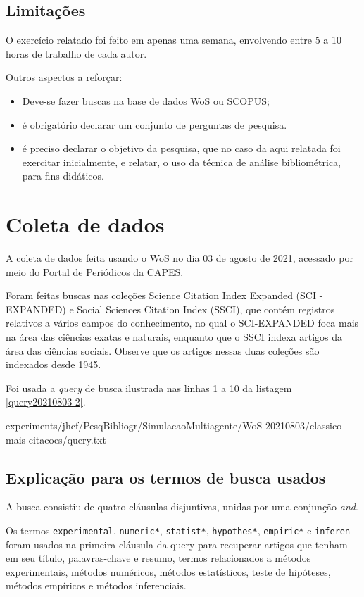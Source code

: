 \subsection{Limitações} O exercício relatado foi feito em apenas uma semana, envolvendo entre 5 a 10 horas de trabalho de cada autor.

Outros aspectos a reforçar:
\begin{itemize}
   
\item Deve-se fazer buscas na base de dados WoS ou SCOPUS;
\item é obrigatório declarar um conjunto de perguntas de pesquisa.
\item é preciso declarar o objetivo da pesquisa, que no caso da aqui relatada foi exercitar inicialmente, e relatar, o uso da técnica de análise bibliométrica, para fins didáticos.
\end{itemize}


\section{Coleta de dados}

A coleta de dados feita usando o WoS no dia 03 de agosto de 2021, acessado por meio do Portal de Periódicos da CAPES.

Foram feitas buscas nas coleções Science  Citation  Index  Expanded (SCI -EXPANDED) e Social  Sciences  Citation  Index (SSCI), que contém registros relativos a vários campos do conhecimento, no qual o SCI-EXPANDED foca mais na área das ciências exatas e naturais, enquanto que o SSCI indexa artigos da área das ciências sociais. Observe que os artigos nessas duas coleções são indexados desde 1945. 

Foi usada a \textit{query} de busca ilustrada nas linhas 1 a 10 da listagem \ref{query20210803-2}.


{experiments/jhcf/PesqBibliogr/SimulacaoMultiagente/WoS-20210803/classico-mais-citacoes/query.txt}

\subsection{Explicação para os termos de busca usados}
A busca consistiu de quatro cláusulas disjuntivas, unidas por uma conjunção \textit{and}.

Os termos \texttt{experimental}, \texttt{numeric*}, \texttt{statist*}, \texttt{hypothes*}, 
\texttt{empiric*}
e \texttt{inferen} foram usados na primeira cláusula da query para recuperar artigos que tenham em seu título, palavras-chave e resumo, termos relacionados a métodos experimentais,
métodos numéricos,
métodos estatísticos,
teste de hipóteses,
métodos empíricos e métodos inferenciais.

